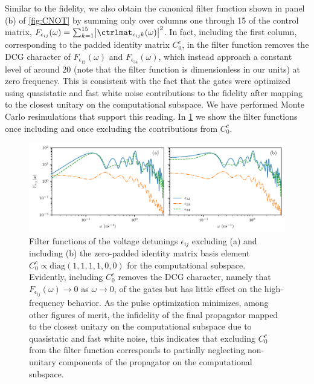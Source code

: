 Similar to the fidelity, we also obtain the canonical filter function shown in panel (b) of \cref{fig:CNOT} by summing only over columns one through 15 of the control matrix, $F_{\epsilon_{ij}}(\omega) = \sum_{k=1}^{15}\bigl\lvert\ctrlmat_{\epsilon_{ij} k}(\omega)\bigr\rvert^2$. In fact, including the first column, corresponding to the padded identity matrix $C_0^c$, in the filter function removes the DCG character of $F_{\epsilon_{12}}(\omega)$ and $F_{\epsilon_{34}}(\omega)$, which instead approach a constant level of around 20 (note that the filter function is dimensionless in our units) at zero frequency. This is consistent with the fact that the gates were optimized using quasistatic and fast white noise contributions to the fidelity after mapping to the closest unitary on the computational subspace. We have performed Monte Carlo resimulations that support this reading. In \cref{appfig:filter_function:cnot} we show the filter functions once including and once excluding the contributions from $C_0^c$.

\begin{figure}
    \centering
    \includegraphics{img/filter_function-CNOT_unitary_v_complete.pdf}
    \caption{Filter functions of the voltage detunings $\epsilon_{ij}$ excluding (a) and including (b) the zero-padded identity matrix basis element $C_0^c\propto\text{diag}(1,1,1,1,0,0)$ for the computational subspace. Evidently, including $C_0^c$ removes the DCG character, namely that $F_{\epsilon_{ij}}(\omega)\rightarrow 0$ as $\omega\rightarrow 0$, of the gates but has little effect on the high-frequency behavior. As the pulse optimization minimizes, among other figures of merit, the infidelity of the final propagator mapped to the closest unitary on the computational subspace due to quasistatic and fast white noise, this indicates that excluding $C_0^c$ from the filter function corresponds to partially neglecting non-unitary components of the propagator on the computational subspace.}
    \label{appfig:filter_function:cnot}
\end{figure}

